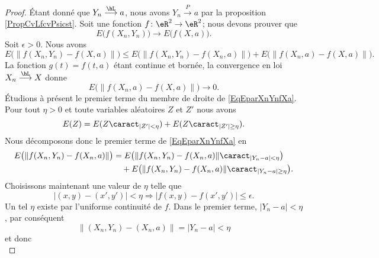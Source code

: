 \begin{proof}
    Étant donné que \( Y_n\stackrel{\hL}{\longrightarrow} a\), nous avons \( Y_n\stackrel{P}{\longrightarrow} a\) par la proposition \ref{PropCvLfcvPsicst}. Soit une fonction \(f\colon \eR^2\to \eR^2 \); nous devons prouver que
    \begin{equation}
        E\big( f(X_n,Y_n) \big)\to E\big( f(X,a) \big).
    \end{equation}
    Soit \( \epsilon>0\). Nous avons
    \begin{equation}    \label{EqEparXnYnfXa}
        E\big( \| f(X_n,Y_n)-f(X,a) \| \big)\leq E\big(  \| f(X_n,Y_n)-f(X_n,a) \|  \big)+E\big(   \| f(X_n,a)-f(X,a) \|  \big).
    \end{equation}
    La fonction \( g(t)=f(t,a)\) étant continue et bornée, la convergence en loi \( X_n\stackrel{\hL}{\longrightarrow}X\) donne
    \begin{equation}
        E\big( \| f(X_n,a)-f(X,a) \| \big)\to 0.
    \end{equation}
    Étudions à présent le premier terme du membre de droite de \eqref{EqEparXnYnfXa}. Pour tout \( \eta> 0\) et toute variables aléatoires \( Z\) et \( Z'\) nous avons
    \begin{equation}
        E(Z)=E(Z\caract_{| Z' |<\eta})+E(Z\caract_{| Z' |\geq \eta}).
    \end{equation}
    Nous décomposons donc le premier terme de \eqref{EqEparXnYnfXa} en
    \begin{equation}    \label{EqEXnADecomsecvolta}
        \begin{aligned}[]
            E\big( \| f(X_n,Y_n)-f(X_n,a) \| \big)&=E\big( \| f(X_n,Y_n)-f(X_n,a) \|\caract_{| Y_n-a |<\eta} \big)\\
            &\quad+E\big( \| f(X_n,Y_n)-f(X_n,a) \|\caract_{| Y_n-a |\geq\eta} \big).
        \end{aligned}
    \end{equation}
    Choisissons maintenant une valeur de \( \eta\) telle que
    \begin{equation}
        | (x,y)-(x',y') |<\eta\Rightarrow| f(x,y)-f(x',y') |\leq \epsilon.
    \end{equation}
    Un tel \( \eta\) existe par l'uniforme continuité de \( f\). Dans le premier terme, \( | Y_n-a |<\eta\), par conséquent
    \begin{equation}
        \| (X_n,Y_n)-(X_n,a) \|=| Y_n-a |<\eta
    \end{equation}
    et donc
    \begin{equation}

\end{equation}
\end{proof}
